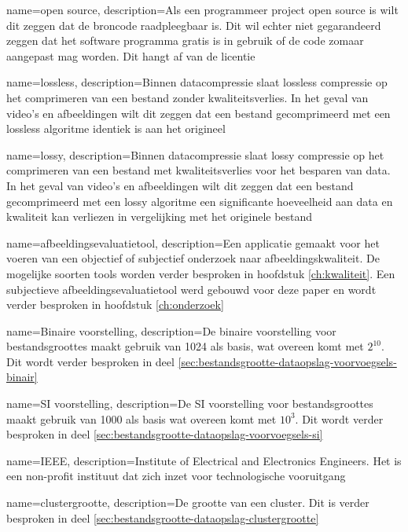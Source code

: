 {
	name={open source},
	description={Als een programmeer project open source is wilt dit zeggen dat de broncode raadpleegbaar is. Dit wil echter niet gegarandeerd zeggen dat het software programma gratis is in gebruik of de code zomaar aangepast mag worden. Dit hangt af van de licentie}
}

{
	name={lossless},
	description={Binnen datacompressie slaat lossless compressie op het comprimeren van een bestand zonder kwaliteitsverlies. In het geval van video's en afbeeldingen wilt dit zeggen dat een bestand gecomprimeerd met een lossless algoritme identiek is aan het origineel}
}

{
	name={lossy},
	description={Binnen datacompressie slaat lossy compressie op het comprimeren van een bestand met kwaliteitsverlies voor het besparen van data. In het geval van video's en afbeeldingen wilt dit zeggen dat een bestand gecomprimeerd met een lossy algoritme een significante hoeveelheid aan data en kwaliteit kan verliezen in vergelijking met het originele bestand}
}

{
	name={afbeeldingsevaluatietool},
	description={Een applicatie gemaakt voor het voeren van een objectief of subjectief onderzoek naar afbeeldingskwaliteit. De mogelijke soorten tools worden verder besproken in hoofdstuk \ref{ch:kwaliteit}. Een subjectieve afbeeldingsevaluatietool werd gebouwd voor deze paper en wordt verder besproken in hoofdstuk \ref{ch:onderzoek}}
}

{
	name={Binaire voorstelling},
	description={De binaire voorstelling voor bestandsgroottes maakt gebruik van 1024 als basis, wat overeen komt met $ 2^{10} $. Dit wordt verder besproken in deel \ref{sec:bestandsgrootte-dataopslag-voorvoegsels-binair}}
}

{
	name={SI voorstelling},
	description={De SI voorstelling voor bestandsgroottes maakt gebruik van 1000 als basis wat overeen komt met $ 10^{3} $. Dit wordt verder besproken in deel \ref{sec:bestandsgrootte-dataopslag-voorvoegsels-si}}
}

{
	name={IEEE},
	description={Institute of Electrical and Electronics Engineers. Het is een non-profit instituut dat zich inzet voor technologische vooruitgang}
}

{
	name={clustergrootte},
	description={De grootte van een cluster. Dit is verder besproken in deel \ref{sec:bestandsgrootte-dataopslag-clustergrootte}}
}

